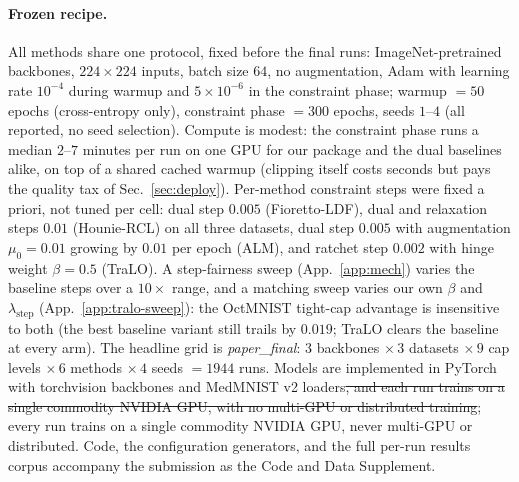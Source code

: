\documentclass[10pt]{article}
\newcommand{\del}[1]{{\color{red}\sout{#1}}}
\begin{document}
\paragraph{Frozen recipe.}
All methods share one protocol, fixed before the final runs:
ImageNet-pretrained backbones, $224{\times}224$ inputs, batch size $64$, no
augmentation, Adam with learning rate $10^{-4}$ during warmup and
$5{\times}10^{-6}$ in the constraint phase; warmup $=50$ epochs
(cross-entropy only), constraint phase $=300$ epochs, seeds $1$--$4$ (all
reported, no seed selection). Compute is modest: the constraint phase runs
a median $2$--$7$ minutes per run on one GPU for our package and the dual
baselines alike, on top of a shared cached warmup (clipping itself costs
seconds but pays the quality tax of Sec.~\ref{sec:deploy}). Per-method
constraint steps were fixed a priori, not tuned per cell: dual step $0.005$
(Fioretto-LDF), dual and relaxation steps $0.01$ (Hounie-RCL) on all three
datasets,{\color{blue} dual step $0.005$ with augmentation $\mu_0{=}0.01$ growing
by $0.01$ per epoch (ALM),} and ratchet step $0.002$ with hinge weight
$\beta{=}0.5$ (TraLO).
A step-fairness sweep (App.~\ref{app:mech}) varies the baseline steps
over a $10\times$ range, and a matching sweep varies our own $\beta$ and
$\lambda_{\text{step}}$ (App.~\ref{app:tralo-sweep}): the OctMNIST
tight-cap advantage is insensitive to both (the best baseline variant still
trails by $0.019$; TraLO clears the baseline at every arm). The headline
grid is \emph{paper\_final}: $3$ backbones $\times\,3$ datasets $\times\,9$
cap levels $\times\,6$ methods $\times\,4$ seeds $=1944$ runs. Models are
implemented in PyTorch with torchvision backbones and MedMNIST v2 loaders\del{,
and each run trains on a single commodity NVIDIA GPU, with no multi-GPU or
distributed training}{\color{blue}; every run trains on a single commodity
NVIDIA GPU, never multi-GPU or distributed}. Code, the configuration generators, and the full
per-run results corpus accompany the submission as the Code and Data
Supplement.
\end{document}
